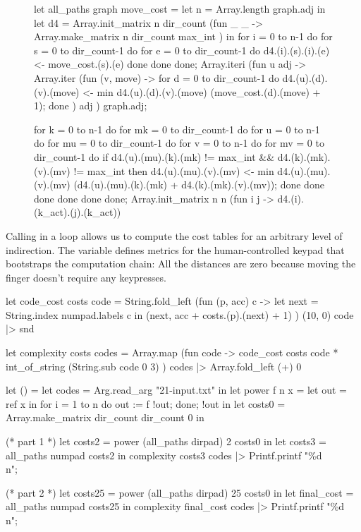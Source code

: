 \documentclass{article}
\begin{document}
\begin{figure}
\begin{code}[ocaml]
let all_paths graph move_cost =
  let n = Array.length graph.adj in
  let d4 = Array.init_matrix n dir_count (fun _ _ ->
               Array.make_matrix n dir_count max_int
             ) in
  for i = 0 to n-1 do
    for s = 0 to dir_count-1 do
      for e = 0 to dir_count-1 do
        d4.(i).(s).(i).(e) <- move_cost.(s).(e)
      done
    done
  done;
  Array.iteri (fun u adj ->
      Array.iter (fun (v, move) ->
          for d = 0 to dir_count-1 do
            d4.(u).(d).(v).(move) <- min d4.(u).(d).(v).(move)
                                         (move_cost.(d).(move) + 1);
          done
        ) adj
    ) graph.adj;

  for k = 0 to n-1 do
    for mk = 0 to dir_count-1 do
      for u = 0 to n-1 do
        for mu = 0 to dir_count-1 do
          for v = 0 to n-1 do
            for mv = 0 to dir_count-1 do
              if d4.(u).(mu).(k).(mk) != max_int &&
                 d4.(k).(mk).(v).(mv) != max_int then
                d4.(u).(mu).(v).(mv) <-
                  min d4.(u).(mu).(v).(mv)
                      (d4.(u).(mu).(k).(mk) + d4.(k).(mk).(v).(mv));
            done
          done
        done
      done
    done
  done;
  Array.init_matrix n n (fun i j -> d4.(i).(k_act).(j).(k_act))
\end{code}
\end{figure}

Calling  in a loop allows us to compute the cost tables for an arbitrary level of indirection.
The  variable defines metrics for the human-controlled keypad that bootstraps the computation chain:
All the distances are zero because moving the finger doesn't require any keypresses.

\begin{code}[ocaml]
let code_cost costs code =
  String.fold_left (fun (p, acc) c ->
      let next = String.index numpad.labels c in
      (next, acc + costs.(p).(next) + 1)
    ) (10, 0) code |> snd

let complexity costs codes =
  Array.map (fun code ->
      code_cost costs code * int_of_string (String.sub code 0 3)
    ) codes
  |> Array.fold_left (+) 0

let () =
  let codes = Arg.read_arg "21-input.txt" in
  let power f n x = let out = ref x in for i = 1 to n do out := f !out; done; !out in
  let costs0 = Array.make_matrix dir_count dir_count 0 in

  (* part 1 *)
  let costs2 = power (all_paths dirpad) 2 costs0 in
  let costs3 = all_paths numpad costs2 in
  complexity costs3 codes |> Printf.printf "\%d\\n";

  (* part 2 *)
  let costs25 = power (all_paths dirpad) 25 costs0 in
  let final_cost = all_paths numpad costs25 in
  complexity final_cost codes |> Printf.printf "\%d\\n";
\end{code}
\end{document}
